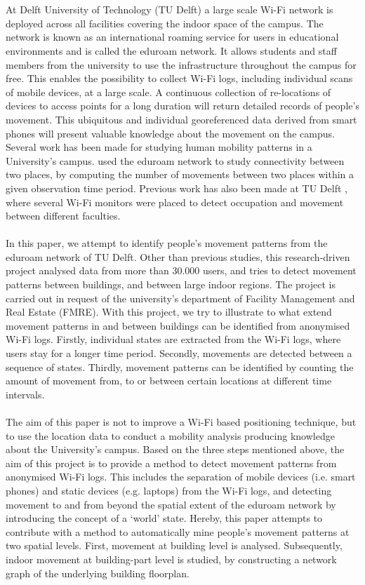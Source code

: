 \\\\
At Delft University of Technology (TU Delft) a large scale Wi-Fi network is deployed across all facilities covering the indoor space of the campus. The network is known as an international roaming service for users in educational environments and is called the eduroam network. It allows students and staff members from the university to use the infrastructure throughout the campus for free. This enables the possibility to collect Wi-Fi logs, including individual scans of mobile devices, at a large scale.  A continuous collection of re-locations of devices to access points for a long duration will return detailed records of people’s movement. This ubiquitous and individual georeferenced data derived from smart phones will present valuable knowledge about the movement on the campus. 
Several work has been made for studying human mobility patterns in a University’s campus.   \cite{meneses2012large} used the eduroam network to study connectivity between two places, by computing the number of movements between two places within a given observation time period. Previous work has also been made at TU Delft \cite{spek2015rhythm}, where several Wi-Fi monitors were placed to detect occupation and movement between different faculties. 
\\\\
In this paper, we attempt to identify people’s movement patterns from the eduroam network of TU Delft. Other than previous studies, this research-driven project analysed data from more than 30.000 users, and tries to detect movement patterns between buildings, and between large indoor regions. The project is carried out in request of the university’s department of Facility Management and Real Estate (FMRE). With this project, we try to illustrate to what extend movement patterns in and between buildings can be identified from anonymised Wi-Fi logs. Firstly, individual states are extracted from the Wi-Fi logs, where users stay for a longer time period. Secondly, movements are detected between a sequence of states. Thirdly, movement patterns can be identified by counting the amount of movement from, to or between certain locations at different time intervals. 
\\\\
The aim of this paper is not to improve a Wi-Fi based positioning technique, but to use the location data to conduct a mobility analysis producing knowledge about the University’s campus. Based on the three steps mentioned above, the aim of this project is to provide a method to detect movement patterns from anonymised Wi-Fi logs. This includes the separation of mobile devices (i.e. smart phones) and static devices (e.g. laptops) from the Wi-Fi logs, and detecting movement to and from beyond the spatial extent of the eduroam network by introducing the concept of a ‘world’ state. Hereby, this paper attempts to contribute with a method to automatically mine people’s movement patterns at two spatial levels. First, movement at building level is analysed. Subsequently, indoor movement at building-part level is studied, by constructing a network graph of the underlying building floorplan. 

